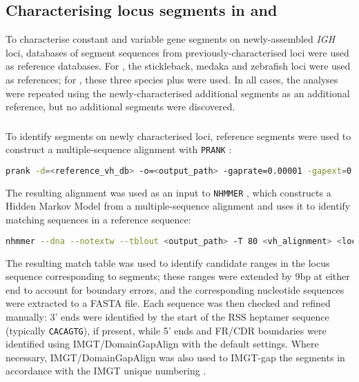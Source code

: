 \subsection{Characterising locus segments in \Nfu and \Xma}
\label{sec:locus-char-methods}

To characterise constant and variable gene segments on newly-assembled \textit{IGH} loci, databases of segment sequences from previously-characterised loci were used as reference databases. For \Nfu, the stickleback, medaka and zebrafish loci were used as references; for \Xma, these three species plus \Nfu were used. In all cases, the analyses were repeated using the newly-characterised additional segments as an additional reference, but no additional segments were discovered.

\subsubsection{\vh}

To identify \vh segments on newly characterised loci, reference \vh segments were used to construct a multiple-sequence alignment with \lstinline{PRANK} \parencite{loytynoja2014prank}:

\begin{lstlisting}[language=bash]
prank -d=<reference_vh_db> -o=<output_path> -gaprate=0.00001 -gapext=0.00001 -F -termgap
\end{lstlisting}

The resulting alignment was used as an input to \lstinline{NHMMER} \parencite{wheeler2013nhmmer,eddy2011hmm,eddy2009homology,eddy2008alignment}, which constructs a Hidden Markov Model from a multiple-sequence alignment and uses it to identify matching sequences in a reference sequence:

\begin{lstlisting}[language=bash]
nhmmer --dna --notextw --tblout <output_path> -T 80 <vh_alignment> <locus_sequence_path>
\end{lstlisting}

The resulting match table was used to identify candidate ranges in the locus sequence corresponding to \vh segments; these ranges were extended by 9bp at either end to account for boundary errors, and the corresponding nucleotide sequences were extracted to a FASTA file. Each sequence was then checked and refined manually: 3' ends were identified by the start of the RSS heptamer sequence (typically \texttt{CACAGTG}), if present, while 5' ends and FR/CDR boundaries were identified using IMGT/DomainGapAlign \parencite{ehrenmann2011domaingapalign} with the default settings. Where necessary, IMGT/DomainGapAlign was also used to IMGT-gap the \vh segments in accordance with the IMGT unique numbering \parencite{lefranc2003vnumbering}. %

